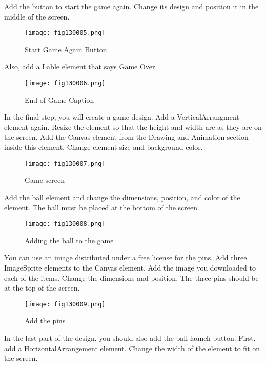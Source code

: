 Add the button to start the game again. Change its design and position it in the middle of the screen.

\begin{figure}[H]
   \centering
   \texttt{[image: fig130005.png]}
   \caption{Start Game Again Button}
\label{fig130005}
\end{figure}

Also, add a Lable element that says Game Over.

\begin{figure}[H]
   \centering
   \texttt{[image: fig130006.png]}
   \caption{End of Game Caption}
\label{fig130006}
\end{figure}

In the final step, you will create a game design. Add a VerticalArrangment element again. Resize the element so that the height and width are as they are on the screen. Add the Canvas element from the Drawing and Animation section inside this element. Change element size and background color.

\begin{figure}[H]
   \centering
   \texttt{[image: fig130007.png]}
   \caption{Game screen}
\label{fig130007}
\end{figure}

Add the ball element and change the dimensions, position, and color of the element. The ball must be placed at the bottom of the screen.

\begin{figure}[H]
   \centering
   \texttt{[image: fig130008.png]}
   \caption{Adding the ball to the game}
\label{fig130008}
\end{figure}

You can use an image distributed under a free license for the pins. Add three ImageSprite elements to the Canvas element. Add the image you downloaded to each of the items. Change the dimensions and position. The three pins should be at the top of the screen.

\begin{figure}[H]
   \centering
   \texttt{[image: fig130009.png]}
   \caption{Add the pins}
\label{fig130009}
\end{figure}

In the last part of the design, you should also add the ball launch button. First, add a HorizontalArrangement element. Change the width of the element to fit on the screen.

